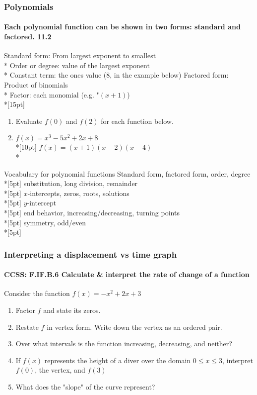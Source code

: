 \documentclass{beamer}
\begin{document}
\frame
{
  \frametitle{Polynomials}
  \framesubtitle{Each polynomial function can be shown in two forms: standard and factored. \qquad \qquad \qquad \alert{11.2}}
\alert{Standard form}: From largest exponent to smallest\\*
\qquad \alert{Order or degree}: value of the largest exponent\\*
\qquad \alert{Constant term}: the ones value (8, in the example below)
\alert{Factored form}: Product of binomials\\*
\qquad \alert{Factor}: each monomial (e.g. "$(x+1)$)\\*[15pt]
  \begin{enumerate}
    \item Evaluate $f(0)$ and $f(2)$ for each function below.
      \item $f(x)=x^3-5x^2+2x+8$ \qquad \\*[10pt]
      $f(x)=(x+1)(x-2)(x-4)$\\*

  \end{enumerate}
}

\begin{frame}{Vocabulary for polynomial functions}
    Standard form, factored form, order, degree\\*[5pt]
    substitution, long division, remainder\\*[5pt]
    $x$-intercepts, zeros, roots, solutions\\*[5pt]
    $y$-intercept\\*[5pt]
    end behavior, increasing/decreasing, turning points\\*[5pt]
    symmetry, odd/even\\*[5pt]
\end{frame}

\frame
{
  \frametitle{Interpreting a displacement vs time graph}
  \framesubtitle{CCSS: F.IF.B.6 Calculate \& interpret the rate of change of a function}

  \begin{block}{Consider the function $f(x)=-x^2+2x+3$}
  \begin{enumerate}
      \item Factor $f$ and state its zeros.
      \item Restate $f$ in vertex form. Write down the vertex as an ordered pair.
      \item Over what intervals is the function increasing, decreasing, and neither?
      \item If $f(x)$ represents the height of a diver over the domain $0 \leq x \leq 3$, interpret $f(0)$, the vertex, and $f(3)$
      \item What does the "slope" of the curve represent?
  \end{enumerate}
  \end{block}
}
\end{document}
